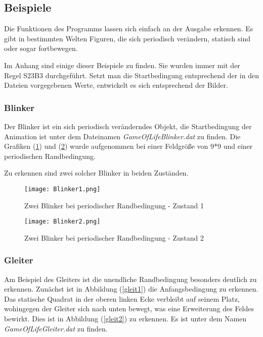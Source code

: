 \documentclass{scrartcl}
\begin{document}
\subsection{Beispiele}
Die Funktionen des Programms lassen sich einfach an der Ausgabe erkennen. Es gibt in bestimmten Welten Figuren, die sich periodisch verändern, statisch sind oder sogar fortbewegen.

Im Anhang sind einige dieser Beispiele zu finden. Sie wurden immer mit der Regel S23B3 durchgeführt. Setzt man die Startbedingung entsprechend der in den Dateien vorgegebenen Werte, entwickelt es sich entsprechend der Bilder.
\subsubsection{Blinker}
Der Blinker ist ein sich periodisch veränderndes Objekt, die Startbedingung der Animation ist unter dem Dateinamen \textit{GameOfLifeBlinker.dat} zu finden. Die Grafiken (\ref{blink1}) und (\ref{blink2}) wurde aufgenommen bei einer Feldgröße von 9*9 und einer periodischen Randbedingung.

Zu erkennen sind zwei solcher Blinker in beiden Zuständen.
\begin{figure}[p]
	\begin{center}
		\texttt{[image: Blinker1.png]}
		\caption{Zwei Blinker bei periodischer Randbedingung - Zustand 1}
		\label{blink1}
	\end{center}
\end{figure}
\begin{figure}[p]
	\begin{center}
		\texttt{[image: Blinker2.png]}
		\caption{Zwei Blinker bei periodischer Randbedingung - Zustand 2}
		\label{blink2}
	\end{center}
\end{figure}

\subsubsection{Gleiter}
Am Beispiel des Gleiters ist die unendliche Randbedingung besonders deutlich zu erkennen. Zunächst ist in Abbildung (\ref{gleit1}) die Anfangsbedingung zu erkennen. Das statische Quadrat in der oberen linken Ecke verbleibt auf seinem Platz, wohingegen der Gleiter sich nach unten bewegt, was eine Erweiterung des Feldes bewirkt. Dies ist in Abbildung (\ref{gleit2}) zu erkennen. Es ist unter dem Namen \textit{GameOfLifeGleiter.dat} zu finden.
\end{document}
